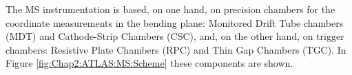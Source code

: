 The MS instrumentation is based, on one hand, on precision chambers for the coordinate measurements in the bending plane: 
Monitored Drift Tube chambers (MDT) and Cathode-Strip Chambers (CSC), and, on the other hand, on trigger chambers:
Resistive Plate Chambers (RPC) and Thin Gap Chambers (TGC). In Figure \ref{fig:Chap2:ATLAS:MS:Scheme} these components
are shown.



